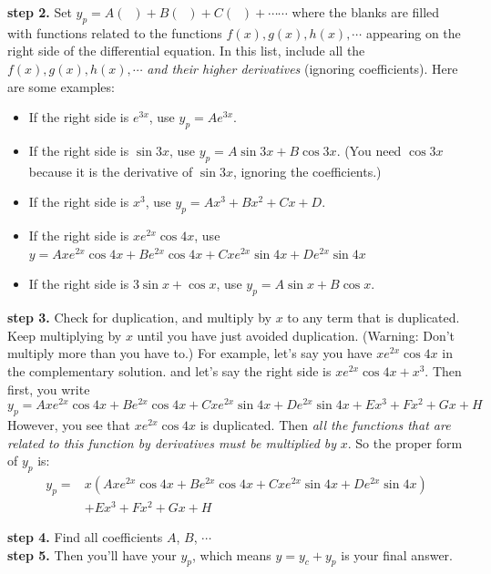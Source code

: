 \documentclass[12pt]{report}
\begin{document}
\textbf{step 2.} Set $y_p = A (\; \; ) + B(\; \; ) + C(\; \; ) +\cdots \cdots $ where the blanks are filled with functions related to the functions $f(x), g(x), h(x), \cdots$ appearing on the right side of the differential equation. In this list, include all the $f(x), g(x), h(x), \cdots$ \textit{and their higher derivatives} (ignoring coefficients). Here are some examples:
\begin{itemize}
	\item If the right side is $e^{3x}$, use $y_p=A e^{3x}$.
	\item If the right side is $\sin{3x}$, use $y_p = A \sin 3x + B \cos 3x$. (You need $\cos 3x$ because it is the derivative of $\sin 3x$, ignoring the coefficients.)
	\item If the right side is $x^3$, use $y_p = A x^3 + B x^2 +C x+ D$.
	\item If the right side is $x e^{2x} \cos{4x}$, use $y= Ax e^{2x} \cos {4x} + B e^{2x} \cos {4x} + Cx e^{2x} \sin {4x}+ D e^{2x} \sin {4x} $
	\item If the right side is $3 \sin{x}+ \cos x $, use $y_p = A \sin x + B \cos x$.
\end{itemize}

\textbf{step 3.} Check for duplication, and multiply by $x$ to any term that is duplicated. Keep multiplying by $x$ until you have just avoided duplication. (Warning: Don't multiply more than you have to.) For example, let's say you have $x e^{2x} \cos{4x}$ in the complementary solution. and let's say the right side is $x e^{2x} \cos{4x}+ x^3$. Then first, you write
$$y_p = Ax e^{2x} \cos {4x} + B e^{2x} \cos {4x} + Cx e^{2x} \sin {4x}+ D e^{2x} \sin {4x} + E x^3 + F x^2 +G x+ H$$
However, you see that $x e^{2x} \cos{4x}$ is duplicated. Then \textit{all the functions that are related to this function by derivatives must be multiplied by} $x$. So the proper form of $y_p$ is:
\begin{equation*}
\begin{split}
y_p =& x\left(Ax e^{2x} \cos {4x} + B e^{2x} \cos {4x} + Cx e^{2x} \sin {4x}+ D e^{2x} \sin {4x}\right) \\
 & + E x^3 + F x^2 +G x+ H
\end{split}
\end{equation*}

\textbf{step 4.} Find all coefficients $A$, $B$, $\cdots$\\

\textbf{step 5.} Then you'll have your $y_p$, which means $y=y_c + y_p$ is your final answer.
\end{document}
